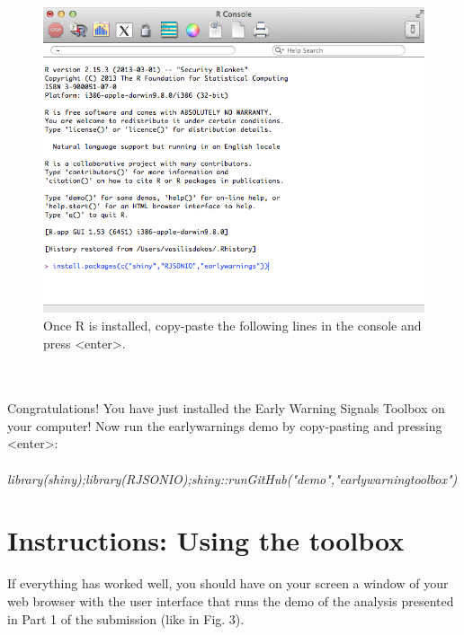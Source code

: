 \documentclass[12pt,a4paper,final]{article}
\begin{document}
\begin{doublespacing}
\begin{figure}[ht]
\begin{center}
\includegraphics[scale=0.55]{R_install_ews5.png}
\caption{Once R is installed, copy-paste the following lines in the console and press <enter>.}
\end{center}
\end{figure}
\\
\\
Congratulations! You have just installed the Early Warning Signals Toolbox on your computer! Now run the earlywarnings demo by copy-pasting and pressing <enter>:\\
\\
\textit{library(shiny);library(RJSONIO);shiny::runGitHub("demo","earlywarningtoolbox")}

\section{Instructions: Using the toolbox}
If everything has worked well, you should have on your screen a window of your web browser with the user interface that runs the demo of the analysis presented in Part 1 of the submission (like in Fig. 3).%



\end{doublespacing}
\end{document}
